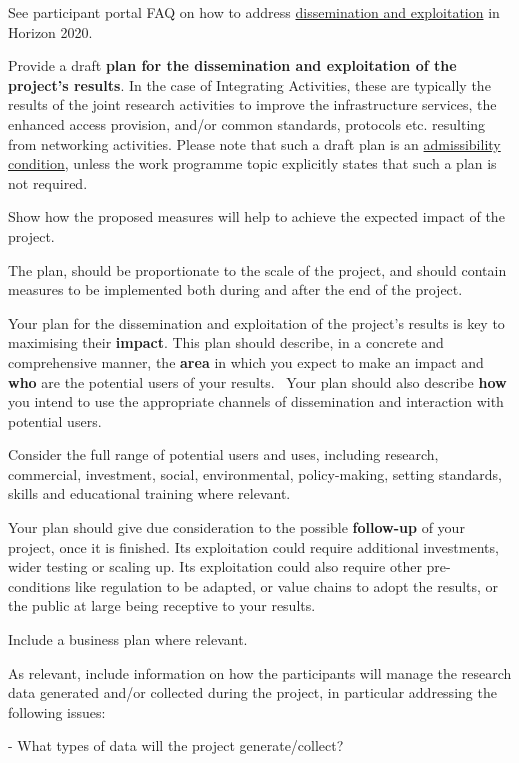 \begin{todo}{}\color{red}
  See participant portal FAQ on how to address \underline{dissemination and exploitation} in Horizon 2020.

  Provide a draft {\bf plan for the dissemination and exploitation of the project's results}. In the case of Integrating Activities, these are typically the results of the joint research activities to improve the infrastructure services, the enhanced access provision, and/or common standards, protocols etc. resulting from networking activities. Please note that such a draft plan is an \underline{admissibility condition}, unless the work programme topic explicitly states that such a plan is not required. 

Show how the proposed measures will help to achieve the expected impact of the project. 

The plan, should be proportionate to the scale of the project, and should contain measures to be implemented both during and after the end of the project. 

Your plan for the dissemination and exploitation of the project's results is key to maximising their {\bf impact}. This plan should describe, in a concrete and comprehensive manner, the {\bf area} in which you expect to make an impact and {\bf who} are the potential users of your results.  Your plan should also describe {\bf how} you intend to use the appropriate channels of dissemination and interaction with potential users.

Consider the full range of potential users and uses, including research, commercial, investment, social, environmental, policy-making, setting standards, skills and educational training where relevant.

Your plan should give due consideration to the possible {\bf follow-up} of your project, once it is finished. Its exploitation could require additional investments, wider testing or scaling up. Its exploitation could also require other pre-conditions like regulation to be adapted, or value chains to adopt the results, or the public at large being receptive to your results.

Include a business plan where relevant.

As relevant, include information on how the participants will manage the research data generated and/or collected during the project, in particular addressing the following issues:

    - What types of data will the project generate/collect?


\end{todo}
